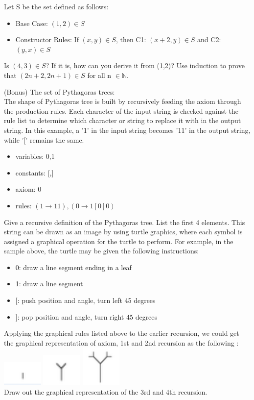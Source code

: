 \documentclass[solution, letterpaper]{cs20inclass}
\begin{document}
\problem Let S be the set defined as follows:
\begin{itemize}
\item Base Case: $(1,2) \in S$
\item Constructor Rules: If $(x,y)\in S$, then C1: $(x+2, y) \in S$ and C2: $(y,x) \in S$ 
\end{itemize}
\subproblem Is $(4,3)\in S$? If it is, how can you derive it from (1,2)?
\subproblem Use induction to prove that $(2n+2, 2n+1)\in S$ for all n $\in \mathbb{N}$.
\pagebreak

\problem (Bonus) The set of Pythagoras trees:\\
The shape of Pythagoras tree is built by recursively feeding the axiom through the production rules. Each character of the input string is checked against the rule list to determine which character or string to replace it with in the output string. In this example, a '1' in the input string becomes '11' in the output string, while '[' remains the same. 
\begin{itemize}
\item variables: 0,1
\item constants: [,]
\item axiom: 0
\item rules: $(1\rightarrow 11), (0\rightarrow 1[0]0)$
\end{itemize}
\subproblem Give a recursive definition of the  Pythagoras tree.
\subproblem List the first 4 elements.
\subproblem This string can be drawn as an image by using turtle graphics, where each symbol is assigned a graphical operation for the turtle to perform. For example, in the sample above, the turtle may be given the following instructions:
\begin{itemize}
\item 0: draw a line segment ending in a leaf
\item 1: draw a line segment
\item $[$: push position and angle, turn left 45 degrees
\item $]$: pop position and angle, turn right 45 degrees
\end{itemize}
Applying the graphical rules listed above to the earlier recursion, we could get the graphical representation of axiom, 1st and 2nd recursion as the following :\\
\includegraphics[width=2cm]{0} 
\includegraphics[width=2cm]{1}
\includegraphics[width=2cm]{2}\\
Draw out the graphical representation of the 3rd and 4th recursion.
\end{document}
